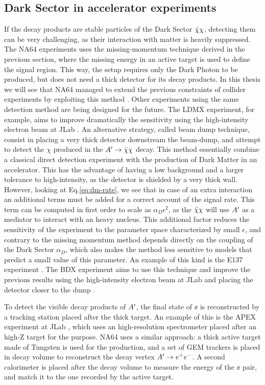   \subsection{Dark Sector in accelerator experiments}

If the decay products are stable particles of the Dark Sector $\bar{\chi} \chi$, detecting them can be very challenging, as their interaction with matter is heavily suppressed. The NA64 experiments uses the missing-momentum technique derived in the previous section, where the missing energy in an active target is used to define the signal region. This way, the setup requires only the Dark Photon to be produced, but does not need a thick detector for its decay products. In this thesis we will see that NA64 managed to extend the previous constraints of collider experiments by exploiting this method \cite{NA64:2019imj}. Other experiments using the same detection method are being designed for the future. The LDMX experiment, for example, aims to improve dramatically the sensitivity using the high-intensity electron beam at JLab \cite{Moreno:2019tfm}. An alternative strategy, called beam dump technique, consist in placing a very thick detector downstream the beam-dump, and attempt to detect the $\chi$ produced in the $A' \to \bar{\chi} \chi$ decay. This method essentially combine a classical direct detection experiment with the production of Dark Matter in an accelerator. This has the advantage of having a low background and a larger tolerance to high-intensity, as the detector is shielded by a very thick wall. However, looking at Eq.\ref{eq:dm-rate}, we see that in case of an extra interaction an additional terms must be added for a correct account of the signal rate. This term can be computed in first order to scale as $\alpha_D \epsilon^2$, as the $\bar{\chi} \chi$ will use $A'$ as a mediator to interact with an heavy nucleus. This additional factor reduces the sensitivity of the experiment to the parameter space characterized by small $\epsilon$, and contrary to the missing momentum method depends directly on the coupling of the Dark Sector $\alpha_D$, which also makes the method less sensitive to models that predict a small value of this parameter. An example of this kind is the E137 experiment \cite{e137}. The BDX experiment aims to use this technique and improve the previous results using the high-intensity electron beam at JLab and placing the detector closer to the dump \cite{Battaglieri:2019nok}.

To detect the visible decay products of $A'$, the final state of $\ee$ is reconstructed by a tracking station placed after the thick target. An example of this is the APEX experiment at JLab \cite{apex}, which uses an high-resolution spectrometer placed after an high-Z target for the purpose. NA64 uses a similar approach: a thick active target made of Tungsten is used for the production, and a set of GEM trackers is placed in decay volume to reconstruct the decay vertex $A' \to e^+e^-$. A second calorimeter is placed after the decay volume to measure the energy of the $\ee$ pair, and match it to the one recorded by the active target.

